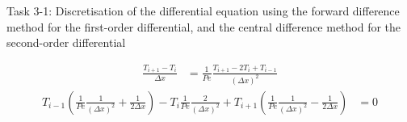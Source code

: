 \documentclass{article}
\begin{document}
Task 3-1: Discretisation of the differential equation using the forward difference method for the first-order differential, and the central difference method for the second-order differential

\begin{align}
  \frac{T_{i + 1} - T_{i}}{\Delta x} &= \frac{1}{Pe} \frac{T_{i + 1} - 2 T_i + T_{i - 1}}{(\Delta x)^2}
\end{align}
\begin{align}
  T_{i - 1}(\frac{1}{Pe} \frac{1}{(\Delta x)^2} + \frac{1}{2 \Delta x}) - T_i \frac{1}{Pe} \frac{2}{(\Delta x)^2} + T_{i + 1}(\frac{1}{Pe} \frac{1}{(\Delta x)^2} - \frac{1}{2 \Delta x}) &= 0
\end{align}
\end{document}
